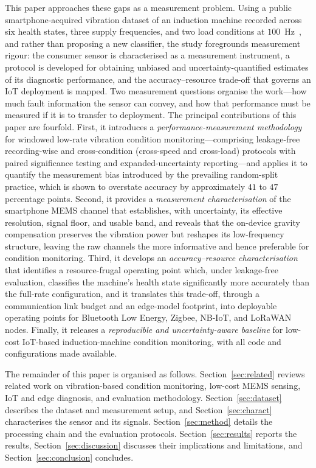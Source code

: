 This paper approaches these gaps as a measurement problem. Using a public
smartphone-acquired vibration dataset of an induction machine recorded across six
health states, three supply frequencies, and two load conditions at
$100$~Hz~\cite{ertargin2026smartphone, ertargin2026dataset}, and rather than
proposing a new classifier, the study foregrounds measurement rigour: the
consumer sensor is characterised as a measurement instrument, a protocol is
developed for obtaining unbiased and uncertainty-quantified estimates of its
diagnostic performance, and the accuracy--resource trade-off that governs an IoT
deployment is mapped. Two measurement questions organise the work---how much
fault information the sensor can convey, and how that performance must be measured
if it is to transfer to deployment. The principal contributions of this paper are
fourfold. First, it introduces a \emph{performance-measurement methodology} for
windowed low-rate vibration condition monitoring---comprising leakage-free
recording-wise and cross-condition (cross-speed and cross-load) protocols with
paired significance testing and expanded-uncertainty reporting---and applies it to
quantify the measurement bias introduced by the prevailing random-split practice,
which is shown to overstate accuracy by approximately $41$ to $47$ percentage
points. Second, it provides a \emph{measurement characterisation} of the
smartphone MEMS channel that establishes, with uncertainty, its effective
resolution, signal floor, and usable band, and reveals that the on-device gravity
compensation preserves the vibration power but reshapes its low-frequency
structure, leaving the raw channels the more informative and hence preferable for
condition monitoring. Third, it develops an
\emph{accuracy--resource characterisation} that identifies a resource-frugal
operating point which, under leakage-free evaluation, classifies the machine's
health state significantly more accurately than the full-rate configuration, and
it translates
this trade-off, through a communication link budget and an edge-model footprint,
into deployable operating points for Bluetooth Low Energy, Zigbee, NB-IoT, and
LoRaWAN nodes. Finally, it releases a \emph{reproducible and uncertainty-aware
baseline} for low-cost IoT-based induction-machine condition monitoring, with all
code and configurations made available.

The remainder of this paper is organised as follows.
Section~\ref{sec:related} reviews related work on vibration-based condition
monitoring, low-cost MEMS sensing, IoT and edge diagnosis, and evaluation
methodology. Section~\ref{sec:dataset} describes the dataset and measurement
setup, and Section~\ref{sec:charact} characterises the sensor and its signals.
Section~\ref{sec:method} details the processing chain and the evaluation
protocols. Section~\ref{sec:results} reports the results,
Section~\ref{sec:discussion} discusses their implications and limitations, and
Section~\ref{sec:conclusion} concludes.
